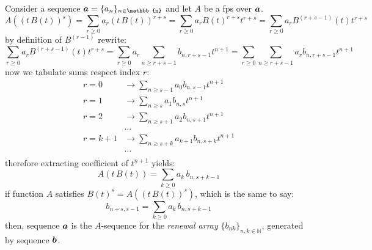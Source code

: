 Consider a sequence
$\vect{a}=\lbrace a_{n} \rbrace_{n\in\mathbb{n}}$ and let $A$ be
a \ac{fps} over $\boldsymbol{a}$.
\begin{displaymath}
    A\left((t\,B(t))^{s}\right) 
        = \sum_{r\geq 0}{a_{r}\left(t\,B(t)\right)^{r+s}}
        = \sum_{r\geq 0}{a_{r}B(t)^{r+s}t^{r+s}}
        = \sum_{r\geq 0}{a_{r}B^{(r+s-1)}(t)t^{r+s}}
\end{displaymath}
by definition of $B^{(r-1)}$ rewrite:
\begin{displaymath}
    \sum_{r\geq 0}{a_{r}B^{(r+s-1)}(t)t^{r+s}}
        =\sum_{r\geq 0}{a_{r}\sum_{n\geq r+s-1}{b_{n,r+s-1}t^{n+1}}}
        =\sum_{r\geq 0}{\sum_{n\geq r+s-1}{a_{r}b_{n,r+s-1}t^{n+1}}}
\end{displaymath}
now we tabulate sums respect index $r$:
\begin{displaymath}
    \begin{split}
        r=0 &\rightarrow \sum_{n\geq s-1}{a_{0}b_{n,s-1}t^{n+1}}\\
        r=1 &\rightarrow \sum_{n\geq s}{a_{1}b_{n,s}t^{n+1}}\\
        r=2 &\rightarrow \sum_{n\geq s+1}{a_{2}b_{n,s+1}t^{n+1}}\\
        &\ldots\\
        r=k+1 &\rightarrow \sum_{n\geq s+k}{a_{k+1}b_{n,s+k}t^{n+1}}\\
        &\ldots\\
    \end{split}
\end{displaymath}
therefore extracting coefficient of $t^{n+1}$ yields:
\begin{displaymath}
    [t^{n+1}]A(t\,B(t))=\sum_{k\geq 0}{a_{k}\,b_{n,s+k-1}}
\end{displaymath}
if function $A$ satisfies $B(t)^{s}=A((t\,B(t))^{s})$, which is the same to say:
\begin{displaymath}
    b_{n+s,s-1}=\sum_{k\geq 0}{a_{k}\,b_{n,s+k-1}}
\end{displaymath}
then, sequence $\boldsymbol{a}$ 
is the $A$-sequence for the \emph{renewal array}
$\lbrace b_{nk}\rbrace_{n,k\in\mathbb{N}}$, generated by
sequence $\boldsymbol{b}$.

















